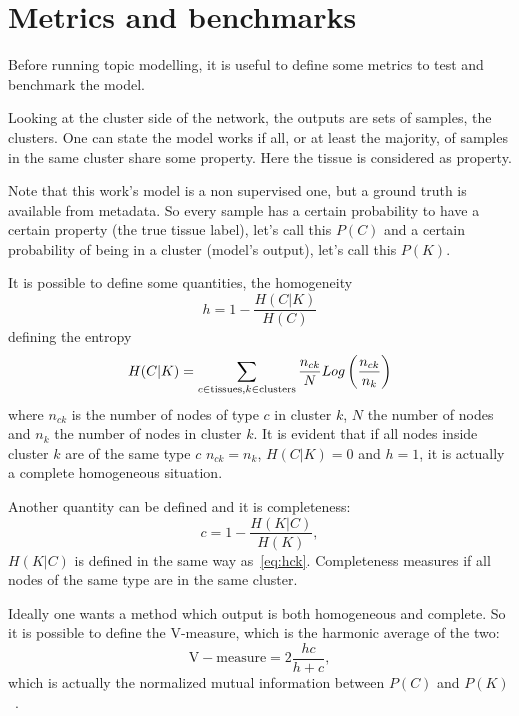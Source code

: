 \section{Metrics and benchmarks}
Before running topic modelling, it is useful to define some metrics to test and benchmark the model.

Looking at the cluster side of the network, the outputs are sets of samples, the clusters. One can state the model works if all, or at least the majority, of samples in the same cluster share some property. Here the tissue is considered as property.

Note that this work's model is a non supervised one, but a ground truth is available from metadata. So every sample has a certain probability to have a certain property (the true tissue label), let's call this $P(C)$ and a certain probability of being in a cluster (model's output), let's call this $P(K)$.

It is possible to define some quantities, the homogeneity
\begin{equation}\label{eq:homogeneity}
    h=1-\frac{H(C|K)}{H(C)}
\end{equation}
defining the entropy
\begin{equation}\label{eq:hck}
    H(C|K)=\sum_{c\in \mathrm{tissues},\\ k \in \mathrm{clusters}}\frac{n_{c k}}{N}Log\left(\frac{n_{c k}}{n_k}\right)
\end{equation}
where $n_{c k}$ is the number of nodes of type $c$ in cluster $k$, $N$ the number of nodes and $n_k$ the number of nodes in cluster $k$. It is evident that if all nodes inside cluster $k$ are of the same type $c$ $n_{c k}=n_{k}$, $H(C|K)=0$ and $h=1$, it is actually a complete homogeneous situation.

Another quantity can be defined and it is completeness:
\begin{equation}\label{eq:completness}
    c=1-\frac{H(K|C)}{H(K)},
\end{equation}
$H(K|C)$ is defined in the same way as~\ref{eq:hck}. Completeness measures if all nodes of the same type are in the same cluster.

Ideally one wants a method which output is both homogeneous and complete. So it is possible to define the V-measure, which is the harmonic average of the two:
\begin{equation}\label{eq:mutualinformation}
    \mathrm{V-measure}=2\frac{h c}{h + c},
\end{equation}
which is actually the normalized mutual information between $P(C)$ and $P(K)$~\cite{rosenberg2007v}.

